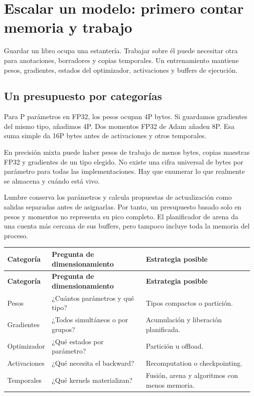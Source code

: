 \documentclass[12pt,a4paper,oneside]{report}
\begin{document}
\chapter{Escalar un modelo: primero contar memoria y trabajo}
\label{ch:escalar}
\begin{idea}
Guardar un libro ocupa una estantería. Trabajar sobre él puede necesitar otra para anotaciones, borradores y copias temporales. Un entrenamiento mantiene pesos, gradientes, estados del optimizador, activaciones y buffers de ejecución.

\end{idea}
\section{Un presupuesto por categorías}
Para P parámetros en FP32, los pesos ocupan 4P bytes. Si guardamos gradientes del mismo tipo, añadimos 4P. Dos momentos FP32 de Adam añaden 8P. Esa suma simple da 16P bytes antes de activaciones y otros temporales.

En precisión mixta puede haber pesos de trabajo de menos bytes, copias maestras FP32 y gradientes de un tipo elegido. No existe una cifra universal de bytes por parámetro para todas las implementaciones. Hay que enumerar lo que realmente se almacena y cuándo está vivo.

Lumbre conserva los parámetros y calcula propuestas de actualización como salidas separadas antes de asignarlas. Por tanto, un presupuesto basado solo en pesos y momentos no representa su pico completo. El planificador de arena da una cuenta más cercana de sus buffers, pero tampoco incluye toda la memoria del proceso.

{\small
\begin{longtable}{@{}P{0.28\textwidth}P{0.32\textwidth}P{0.34\textwidth}@{}}
\toprule
\textbf{Categoría} & \textbf{Pregunta de dimensionamiento} & \textbf{Estrategia posible}\\
\midrule
\endfirsthead
\toprule
\textbf{Categoría} & \textbf{Pregunta de dimensionamiento} & \textbf{Estrategia posible}\\
\midrule
\endhead
Pesos & ¿Cuántos parámetros y qué tipo? & Tipos compactos o partición.\\
Gradientes & ¿Todos simultáneos o por grupos? & Acumulación y liberación planificada.\\
Optimizador & ¿Qué estados por parámetro? & Partición u offload.\\
Activaciones & ¿Qué necesita el backward? & Recomputation o checkpointing.\\
Temporales & ¿Qué kernels materializan? & Fusión, arena y algoritmos con menos memoria.\\
\bottomrule
\end{longtable}
}
\end{document}
